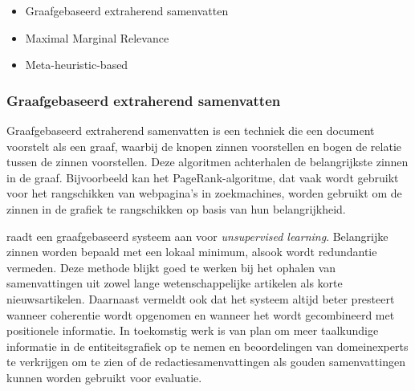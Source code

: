 \begin{itemize}
	\item Graafgebaseerd extraherend samenvatten
	\item Maximal Marginal Relevance
	\item Meta-heuristic-based
\end{itemize}

\subsubsection{Graafgebaseerd extraherend samenvatten}

Graafgebaseerd extraherend samenvatten is een techniek die een document voorstelt als een graaf, waarbij de knopen zinnen voorstellen en bogen de relatie tussen de zinnen voorstellen. Deze algoritmen achterhalen de belangrijkste zinnen in de graaf. Bijvoorbeeld kan het PageRank-algoritme, dat vaak wordt gebruikt voor het rangschikken van webpagina's in zoekmachines, worden gebruikt om de zinnen in de grafiek te rangschikken op basis van hun belangrijkheid.

\textcite{Parveen2015} raadt een graafgebaseerd systeem aan voor \textit{unsupervised learning}. Belangrijke zinnen worden bepaald met een lokaal minimum, alsook wordt redundantie vermeden. Deze methode blijkt goed te werken bij het ophalen van samenvattingen uit zowel lange wetenschappelijke artikelen als korte nieuwsartikelen. Daarnaast vermeldt \textcite{Parveen2015} ook dat het systeem altijd beter presteert wanneer coherentie wordt opgenomen en wanneer het wordt gecombineerd met positionele informatie. In toekomstig werk is \textcite{Parveen2015} van plan om meer taalkundige informatie in de entiteitsgrafiek op te nemen en beoordelingen van domeinexperts te verkrijgen om te zien of de redactiesamenvattingen als gouden samenvattingen kunnen worden gebruikt voor evaluatie.

